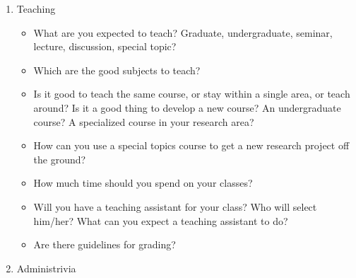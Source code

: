 \begin{enumerate}
\begin{enumerate}
\begin{itemize}\item
	How important are graduate students? How many should you expect to have? How 
many graduate students is too many? How much time/effort should you be 
investing in your graduate students? How much advising should you expect to do?
\item
	How do you identify good graduate students? What qualities should you look for?  
How aggressive should you be in recruiting them? Do you need to find 
money/equipment/office space for them? What should you expect from your 
graduate students? How do you identify a problem graduate student?
\item
	How do you promote your graduate students to the rest of the community (at the U 
of I and nationally/internationally)?
\item
	Similar questions for undergraduate research assistants: Should you have them? 
How many? What kind of commitment in time, effort, and resources should you 
expect to make? What kind of return should you expect?
\item
	What should you keep in files on your students? Remember that you will have to 
write reviews and recommendations for them.
\end{itemize}

\item
 Teaching


\begin{itemize}\item
	What are you expected to teach? Graduate, undergraduate, seminar, lecture, 
discussion, special topic?
\item
	Which are the good subjects to teach?
\item
	Is it good to teach the same course, or stay within a single area, or teach around?  
Is it a good thing to develop a new course? An undergraduate course? A 
specialized course in your research area?
\item
	How can you use a special topics course to get a new research project off the 
ground?
\item
	How much time should you spend on your classes?
\item
	Will you have a teaching assistant for your class? Who will select him/her? What 
can you expect a teaching assistant to do?
\item
	Are there guidelines for grading?

\end{itemize}
\item
Administrivia



\end{enumerate}
\end{enumerate}
